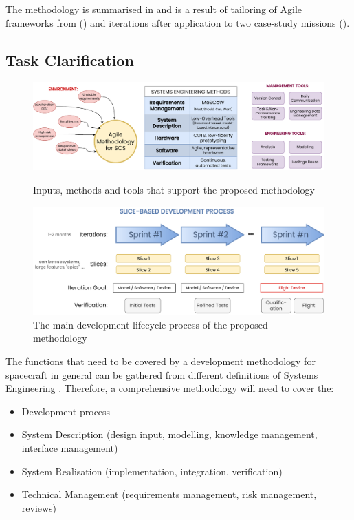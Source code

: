 \documentclass[journal,10pt]{IEEEtran}
\begin{document}
The methodology is summarised in  and is a result of tailoring of Agile frameworks from  () and iterations after application to two case-study missions ().

\subsection{Task Clarification}
\label{sec:task_clarification}

\begin{figure}[th]
	\centering
	\includegraphics[width=.9\linewidth]{media/AgileMethodology.pdf}
	\caption{Inputs, methods and tools that support the proposed methodology}
	\label{fig:methodology}
	\centering
	\includegraphics[width=.9\linewidth]{media/AgileProcess.drawio.pdf}
	\caption{The main development lifecycle process of the proposed methodology}
	\label{fig:process}
\end{figure}


The functions that need to be covered by a development methodology for spacecraft in general can be gathered from different definitions of Systems Engineering \autocite{sheaNASASystemsEngineering2020,ECSS-E-ST-10C}. Therefore, a comprehensive methodology will need to cover the:
\begin{itemize}
	\item Development process \autocite{sebok_drivers}
	\item System Description (design input, modelling, knowledge management, interface management)
	\item System Realisation (implementation, integration, verification)%
	\item Technical Management (requirements management, risk management, reviews)
\end{itemize}
\end{document}
